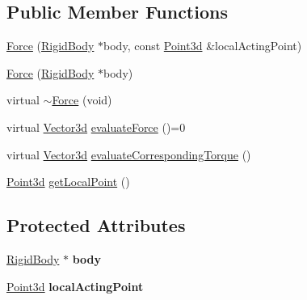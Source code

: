 \subsection*{Public Member Functions}
\begin{DoxyCompactItemize}
\item 
\hyperlink{classCartWheel_1_1Physics_1_1Force_a160fedc7c67205cfa932a8d1d800928e}{Force} (\hyperlink{classCartWheel_1_1Physics_1_1RigidBody}{RigidBody} $\ast$body, const \hyperlink{classCartWheel_1_1Math_1_1Point3d}{Point3d} \&localActingPoint)
\item 
\hyperlink{classCartWheel_1_1Physics_1_1Force_abd3dad6fe06acd39ddba2b684d97aef2}{Force} (\hyperlink{classCartWheel_1_1Physics_1_1RigidBody}{RigidBody} $\ast$body)
\item 
virtual \hyperlink{classCartWheel_1_1Physics_1_1Force_ab1ad766d15b6ba1b4df8a365630bd447}{$\sim$Force} (void)
\item 
virtual \hyperlink{classCartWheel_1_1Math_1_1Vector3d}{Vector3d} \hyperlink{classCartWheel_1_1Physics_1_1Force_a40ed851fc5773dfd6e00a6facf7cf719}{evaluateForce} ()=0
\item 
virtual \hyperlink{classCartWheel_1_1Math_1_1Vector3d}{Vector3d} \hyperlink{classCartWheel_1_1Physics_1_1Force_a269d938ebca563f217e32889e79b555c}{evaluateCorrespondingTorque} ()
\item 
\hyperlink{classCartWheel_1_1Math_1_1Point3d}{Point3d} \hyperlink{classCartWheel_1_1Physics_1_1Force_aecb0b1317e793fd12ac76e6fa92474a8}{getLocalPoint} ()
\end{DoxyCompactItemize}
\subsection*{Protected Attributes}
\begin{DoxyCompactItemize}
\item 
\hypertarget{classCartWheel_1_1Physics_1_1Force_a3b18a29c82290d2c58dd562dc4c64515}{
\hyperlink{classCartWheel_1_1Physics_1_1RigidBody}{RigidBody} $\ast$ {\bfseries body}}
\label{classCartWheel_1_1Physics_1_1Force_a3b18a29c82290d2c58dd562dc4c64515}

\item 
\hypertarget{classCartWheel_1_1Physics_1_1Force_a892c40de24d78bbfec4822660f4cfdce}{
\hyperlink{classCartWheel_1_1Math_1_1Point3d}{Point3d} {\bfseries localActingPoint}}
\label{classCartWheel_1_1Physics_1_1Force_a892c40de24d78bbfec4822660f4cfdce}

\end{DoxyCompactItemize}


